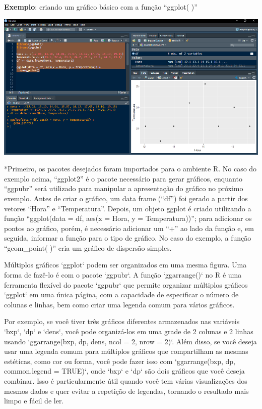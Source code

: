\documentclass[
]{book}
\begin{document}
\textbf{Exemplo}: criando um gráfico básico com a função ``ggplot( )''

\includegraphics{images/clipboard-1758074744.png}

*Primeiro, os pacotes desejados foram importados para o ambiente R. No caso do exemplo acima, ``ggplot2'' é o pacote necessário para gerar gráficos, enquanto ``ggpubr'' será utilizado para manipular a apresentação do gráfico no próximo exemplo. Antes de criar o gráfico, um data frame (``df'') foi gerado a partir dos vetores ``Hora'' e ``Temperatura''. Depois, um objeto ggplot é criado utilizando a função ``ggplot(data = df, aes(x = Hora, y = Temperatura))''; para adicionar os pontos ao gráfico, porém, é necessário adicionar um ``+'' ao lado da função e, em seguida, informar a função para o tipo de gráfico. No caso do exemplo, a função ``geom\_point( )'' cria um gráfico de dispersão simples.

Múltiplos gráficos `ggplot` podem ser organizados em uma mesma figura. Uma forma de fazê-lo é com o pacote `ggpubr`. A função `ggarrange()` no R é uma ferramenta flexível do pacote `ggpubr` que permite organizar múltiplos gráficos `ggplot` em uma única página, com a capacidade de especificar o número de colunas e linhas, bem como criar uma legenda comum para vários gráficos.

Por exemplo, se você tiver três gráficos diferentes armazenados nas variáveis `bxp`, `dp` e `dens`, você pode organizá-los em uma grade de 2 colunas e 2 linhas usando `ggarrange(bxp, dp, dens, ncol = 2, nrow = 2)`. Além disso, se você deseja usar uma legenda comum para múltiplos gráficos que compartilham as mesmas estéticas, como cor ou forma, você pode fazer isso com `ggarrange(bxp, dp, common.legend = TRUE)`, onde `bxp` e `dp` são dois gráficos que você deseja combinar. Isso é particularmente útil quando você tem várias visualizações dos mesmos dados e quer evitar a repetição de legendas, tornando o resultado mais limpo e fácil de ler.
\end{document}
